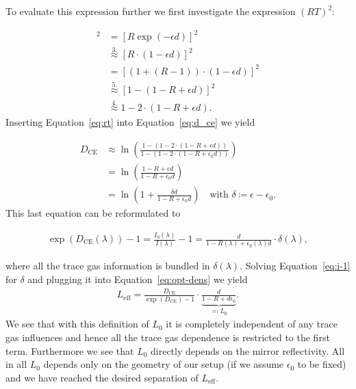 To evaluate this expression further we
first investigate the expression $(RT)^2$:

\begin{align}
  [RT]^2 & = [R \exp(-\epsilon d)]^2 \nonumber\\
         & \stackrel{3.}{\approx} [R \cdot(1 - \epsilon d)]^2 \nonumber\\
         & = [(1 + (R - 1))\cdot (1 - \epsilon d)]^2 \nonumber\\
         & \stackrel{5.}{\approx} [1 - (1 - R + \epsilon d)]^2 \nonumber\\
         & \stackrel{4.}{\approx} 1 - 2 \cdot (1 - R + \epsilon d)\label{eq:rt}.
\end{align}
Inserting Equation~\eqref{eq:rt} into Equation~\eqref{eq:d_ce} we
yield

\begin{align}
  D_{\text{CE}} & \approx \ln \left ( \frac{1 - (1 - 2\cdot ( 1- R +
  \epsilon d))}{1 - (1 - 2 \cdot (1 - R + \epsilon_0 d))}\right)\\
  & = \ln \left ( \frac{1 - R + \epsilon d}{1 - R + \epsilon_0
    d}\right) \\
  & = \ln \left ( 1 + \frac{ \delta d}{1 - R + \epsilon_0 d}\right) \quad
    \text{with } \delta \coloneqq \epsilon - \epsilon_0.
\end{align}
This last equation can be reformulated to

\begin{align}
  \exp(D_{\text{CE}}(\lambda)) - 1 = \frac{I_0(\lambda)}{I(\lambda)} -
  1 = \frac{d}{1 - R(\lambda) + \epsilon_0(\lambda) d} \cdot
  \delta(\lambda)\label{eq:i-1}, 
\end{align}

where all the trace gas information is bundled in
$\delta(\lambda)$. Solving Equation~\eqref{eq:i-1} for $\delta$ and
plugging it into Equation~\eqref{eq:opt-dens} we yield
\begin{align}
  L_{\text{eff}} = \frac{D_{\text{CE}}}{\exp(D_{\text{CE}}) - 1} \cdot
  \underbrace{\frac{d}{1 - R + d\epsilon_0}}_{\eqqcolon L_0}.
\end{align}
We see that with this definition of $L_0$ it is completely independent
of any trace gas influences and hence all the trace gas dependence is
restricted to the first term. Furthermore we see that $L_0$ directly
depends on the mirror reflectivity. All in all $L_0$ depends only on
the geometry of our setup (if we assume $\epsilon_0$ to be fixed) and
we have reached the desired separation of $L_{\text{eff}}$.

